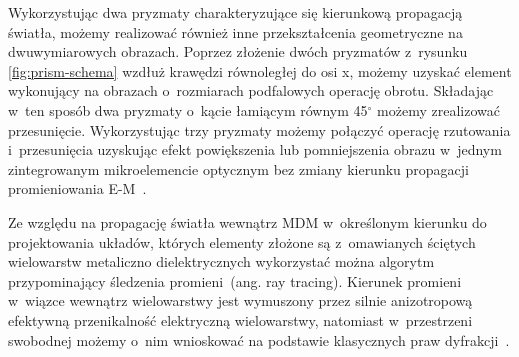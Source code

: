 Wykorzystując dwa pryzmaty charakteryzujące się kierunkową propagacją światła, możemy realizować również inne przekształcenia geometryczne na dwuwymiarowych obrazach. Poprzez złożenie dwóch pryzmatów z~rysunku \ref{fig:prism-schema} wzdłuż krawędzi równoległej do osi x, możemy uzyskać element wykonujący na obrazach o~rozmiarach podfalowych operację obrotu. Składając w~ten sposób dwa pryzmaty o~kącie łamiącym równym 45$^\circ$ możemy zrealizować przesunięcie. Wykorzystując trzy pryzmaty możemy połączyć operację rzutowania i~przesunięcia uzyskując efekt powiększenia lub pomniejszenia obrazu w~jednym zintegrowanym mikroelemencie optycznym bez zmiany kierunku propagacji promieniowania E-M~\cite{Zhao:08}.

Ze względu na propagację światła wewnątrz MDM w~określonym kierunku do projektowania układów, których elementy złożone są z~omawianych ściętych wielowarstw metaliczno dielektrycznych wykorzystać można algorytm przypominający śledzenia promieni~(ang. ray tracing). Kierunek promieni w~wiązce wewnątrz wielowarstwy jest wymuszony  przez silnie anizotropową efektywną przenikalność elektryczną wielowarstwy, natomiast w~przestrzeni swobodnej możemy o~nim wnioskować na podstawie klasycznych praw dyfrakcji~\cite{pastuszczak2011slanted}.

